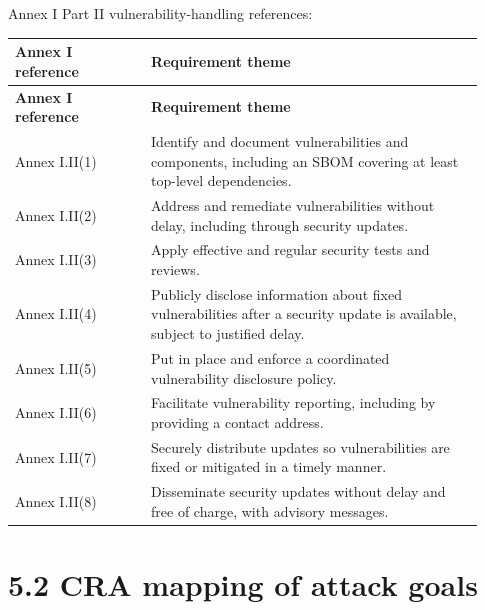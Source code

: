 \documentclass[10pt,a4paper,oneside]{report}
\begin{document}
Annex I Part II vulnerability-handling references:

\begingroup
\scriptsize
\setlength{\tabcolsep}{4pt}
\begin{longtable}{@{}>{\RaggedRight\arraybackslash}p{0.27\linewidth}>{\RaggedRight\arraybackslash}p{0.66\linewidth}@{}}
\toprule
\textbf{Annex I reference} & \textbf{Requirement theme} \\
\midrule
\endfirsthead
\toprule
\textbf{Annex I reference} & \textbf{Requirement theme} \\
\midrule
\endhead
Annex I.II(1) & Identify and document vulnerabilities and components, including an SBOM covering at least top-level dependencies. \\
Annex I.II(2) & Address and remediate vulnerabilities without delay, including through security updates. \\
Annex I.II(3) & Apply effective and regular security tests and reviews. \\
Annex I.II(4) & Publicly disclose information about fixed vulnerabilities after a security update is available, subject to justified delay. \\
Annex I.II(5) & Put in place and enforce a coordinated vulnerability disclosure policy. \\
Annex I.II(6) & Facilitate vulnerability reporting, including by providing a contact address. \\
Annex I.II(7) & Securely distribute updates so vulnerabilities are fixed or mitigated in a timely manner. \\
Annex I.II(8) & Disseminate security updates without delay and free of charge, with advisory messages. \\
\bottomrule
\end{longtable}
\endgroup


\section{5.2 CRA mapping of attack goals}
\end{document}
